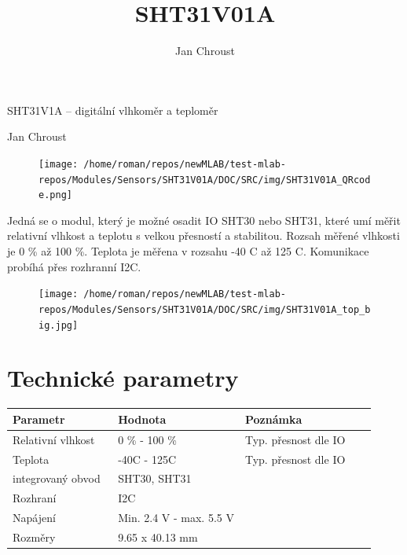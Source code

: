 \documentclass[12pt,a4paper]{article}
\author{ Jan Chroust }
\title{ SHT31V01A }
\begin{document}
\fontsize{14.4}{20}\selectfont

\vspace*{\fill}

\begin{center}
{\Huge SHT31V1A – digitální vlhkoměr a teploměr}

{\Large Jan Chroust}

\vspace*{\fill}
\vspace*{1cm}

\end{center}
\begin{figure}
    \texttt{[image: /home/roman/repos/newMLAB/test-mlab-repos/Modules/Sensors/SHT31V01A/DOC/SRC/img/SHT31V01A\_QRcode.png]}
\end{figure}

Jedná se o modul, který je možné osadit IO SHT30 nebo SHT31, které umí
měřit relativní vlhkost a teplotu s velkou přesností a stabilitou.
Rozsah měřené vlhkosti je 0 \% až 100 \%. Teplota je měřena v rozsahu
-40 C až 125 C. Komunikace probíhá přes rozhranní I2C.


\vspace*{\fill}
\vfill
\vspace*{1cm}

\begin{figure}[ht!]
\centering
\texttt{[image: /home/roman/repos/newMLAB/test-mlab-repos/Modules/Sensors/SHT31V01A/DOC/SRC/img/SHT31V01A\_top\_big.jpg]} 
\end{figure}
\vspace*{1cm}

\vspace*{\fill}
\vfill
\section{Technické parametry}\label{technickuxe9-parametry}

\begin{longtable}[c]{@{}lll@{}}
\toprule
Parametr ~ ~ ~ ~ & Hodnota ~ ~ ~ & Poznámka ~ ~ ~ ~ ~ ~\tabularnewline
\midrule
\endhead
Relativní vlhkost & 0 \% - 100 \% ~ & Typ. přesnost dle
IO\tabularnewline
Teplota ~ ~ ~ ~ ~ & -40C - 125C ~ & Typ. přesnost dle IO\tabularnewline
integrovaný obvod & SHT30, SHT31 & ~ ~ ~ ~ ~ ~ ~ ~ ~ ~\tabularnewline
Rozhraní & I2C &\tabularnewline
Napájení & Min. 2.4 V - max. 5.5 V &\tabularnewline
Rozměry & 9.65 x 40.13 mm &\tabularnewline
\bottomrule
\end{longtable}
\end{document}
